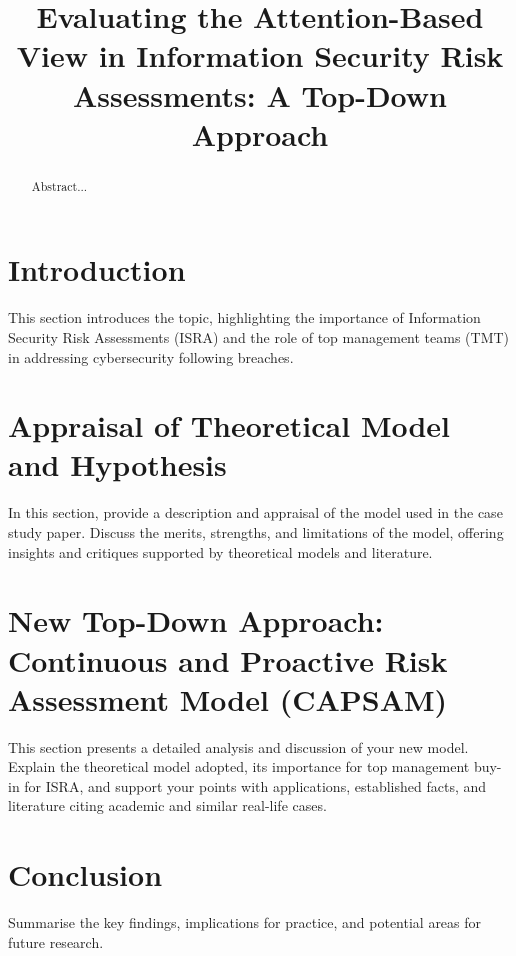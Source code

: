 \documentclass[conference]{IEEEtran}
\begin{document}
\title{Evaluating the Attention-Based View in Information Security Risk Assessments: A Top-Down Approach}

\author{
}

\maketitle

\begin{abstract}
    Abstract...
\end{abstract}

\section{Introduction}
This section introduces the topic, highlighting the importance of Information Security Risk Assessments (ISRA) and the role of top management teams (TMT) in addressing cybersecurity following breaches.

\section{Appraisal of Theoretical Model and Hypothesis}
In this section, provide a description and appraisal of the model used in the case study paper. Discuss the merits, strengths, and limitations of the model, offering insights and critiques supported by theoretical models and literature.

\section{New Top-Down Approach: Continuous and Proactive Risk Assessment Model (CAPSAM)}
This section presents a detailed analysis and discussion of your new model. Explain the theoretical model adopted, its importance for top management buy-in for ISRA, and support your points with applications, established facts, and literature citing academic and similar real-life cases.

\section{Conclusion}
Summarise the key findings, implications for practice, and potential areas for future research.

\printbibliography
\end{document}
